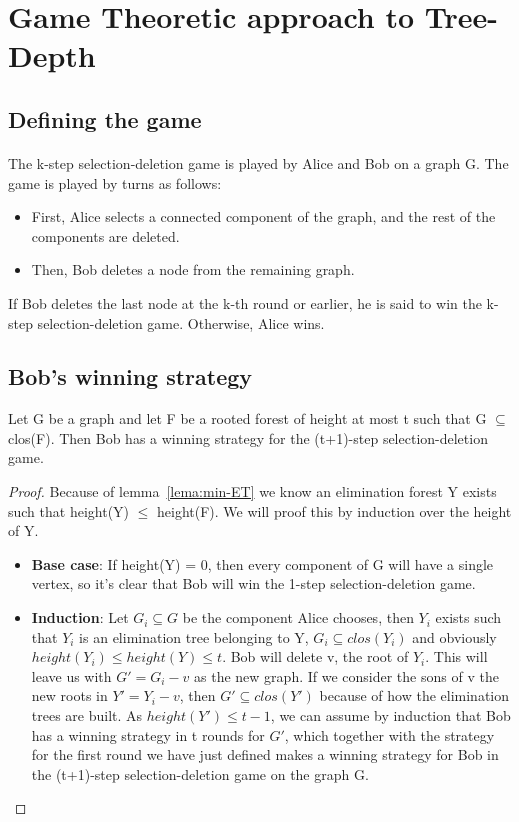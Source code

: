 \section{Game Theoretic approach to Tree-Depth}

\subsection{Defining the game}
\paragraph{}
The k-step selection-deletion game is played by Alice and Bob on a graph G. The game is played by turns as follows:
\begin{itemize}
  \item First, Alice selects a connected component of the graph, and the rest of the components are deleted.
  \item Then, Bob deletes a node from the remaining graph.
\end{itemize}

If Bob deletes the last node at the k-th round or earlier, he is said to win the k-step selection-deletion game. Otherwise, Alice wins. 

\subsection{Bob's winning strategy}
\begin{lemma}
Let G be a graph and let F be a rooted forest of height at most t such that G $\subseteq$ clos(F). Then Bob has a winning strategy for the (t+1)-step selection-deletion game.
\end{lemma}
\begin{proof}
Because of lemma~\ref{lema:min-ET} we know an elimination forest Y exists such that height(Y) $\leq$ height(F).
We will proof this by induction over the height of Y.
\begin{itemize}
  \item \textbf{Base case}: If height(Y) = 0, then every component of G will have a single vertex, so it's clear that Bob will win the 1-step selection-deletion game.
  \item \textbf{Induction}: Let $G_i \subseteq G$ be the component Alice chooses, then $Y_i$ exists such that $Y_i$ is an elimination tree belonging to Y, $G_i \subseteq clos(Y_i)$ and obviously $height(Y_i) \leq height(Y) \leq t$. Bob will delete v, the root of $Y_i$. This will leave us with $G' = G_i - v$ as the new graph. If we consider the sons of v the new roots in $Y' = Y_i - v$, then $G' \subseteq clos(Y')$ because of how the elimination trees are built. As $height(Y') \leq t-1$, we can assume by induction that Bob has a winning strategy in t rounds for $G'$, which together with the strategy for the first round we have just defined makes a winning strategy for Bob in the (t+1)-step selection-deletion game on the graph G.
\end{itemize}
\end{proof}

